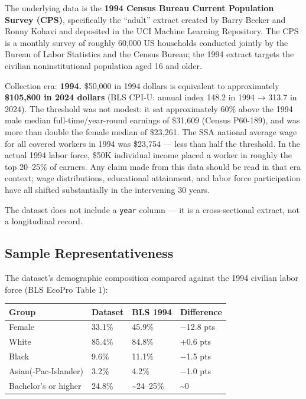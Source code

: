 \documentclass[
  letterpaper,
  DIV=11,
  numbers=noendperiod]{scrartcl}
\begin{document}
The underlying data is the \textbf{1994 Census Bureau Current Population
Survey (CPS)}, specifically the ``adult'' extract created by Barry
Becker and Ronny Kohavi and deposited in the UCI Machine Learning
Repository. The CPS is a monthly survey of roughly 60,000 US households
conducted jointly by the Bureau of Labor Statistics and the Census
Bureau; the 1994 extract targets the civilian noninstitutional
population aged 16 and older.

Collection era: \textbf{1994.} \$50,000 in 1994 dollars is equivalent to
approximately \textbf{\$105,800 in 2024 dollars} (BLS CPI-U: annual
index 148.2 in 1994 → 313.7 in 2024). The threshold was not modest: it
sat approximately 60\% above the 1994 male median full-time/year-round
earnings of \$31,609 (Census P60-189), and was more than double the
female median of \$23,261. The SSA national average wage for all covered
workers in 1994 was \$23,754 --- less than half the threshold. In the
actual 1994 labor force, \$50K individual income placed a worker in
roughly the top 20--25\% of earners. Any claim made from this data
should be read in that era context; wage distributions, educational
attainment, and labor force participation have all shifted substantially
in the intervening 30 years.

The dataset does not include a \texttt{year} column --- it is a
cross-sectional extract, not a longitudinal record.

\subsection{Sample Representativeness}\label{sample-representativeness}

The dataset's demographic composition compared against the 1994 civilian
labor force (BLS EcoPro Table 1):

\begin{longtable}[]{@{}llll@{}}
\toprule\noalign{}
Group & Dataset & BLS 1994 & Difference \\
\midrule\noalign{}
\endhead
\bottomrule\noalign{}
\endlastfoot
Female & 33.1\% & 45.9\% & −12.8 pts \\
White & 85.4\% & 84.8\% & +0.6 pts \\
Black & 9.6\% & 11.1\% & −1.5 pts \\
Asian(-Pac-Islander) & 3.2\% & 4.2\% & −1.0 pts \\
Bachelor's or higher & 24.8\% & \textasciitilde24--25\% &
\textasciitilde0 \\
\end{longtable}
\end{document}

